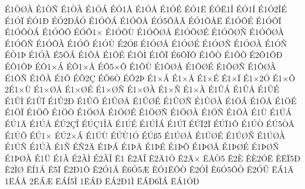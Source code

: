 {^^c91^^d2^^d8^^c0
^^c91^^d2^^d1
^^c91^^d2^^c0
^^c91^^d3^^c1
^^c9^^d31^^c2
^^c91^^d3^^c5
^^c91^^d3^^c9
^^c9^^d31^^cb
^^c9^^d3^^cb1^^ce
^^c9^^d31^^cd
^^c91^^d32^^ce^^c9
^^c91^^d3^^cf
^^c9^^d31^^d0
^^c9^^d32^^d0^^c1^^d3
^^c91^^d3^^d4^^c1
^^c91^^d3^^d4^^c5
^^c9^^d35^^d4^^c5^^c3
^^c9^^d31^^d4^^c5^^cb
^^c91^^d3^^d4^^c9
^^c91^^d3^^d4^^cf
^^c91^^d3^^d4^^d2^^c1
^^c91^^d3^^d4^^d5
^^c9^^d3^^d41^^d7
^^c91^^d3^^d4^^d9
^^c91^^d3^^d4^^d8^^c5
^^c91^^d3^^d4^^d8^^c9
^^c91^^d3^^d4^^d8^^d1
^^c91^^d3^^d4^^d8^^c0
^^c91^^d3^^d4^^d1
^^c91^^d3^^d4^^c0
^^c91^^d3^^d5
^^c91^^d3^^d9
^^c92^^d3^^df
^^c91^^d3^^d8^^c5
^^c91^^d3^^d8^^c9
^^c91^^d3^^d8^^d1
^^c91^^d3^^d8^^c0
^^c91^^d3^^d1
^^c9^^d31^^de
^^c91^^d3^^c0
^^c95^^d4^^c1
^^c91^^d4^^c5
^^c91^^d4^^c9
^^c91^^d4^^cc
^^c91^^d4^^cf
^^c96^^d4^^cf^^d4
^^c91^^d4^^d2
^^c91^^d4^^d5
^^c92^^d41^^d5^^d0
^^c9^^d41^^d5^^de
^^c9^^d41^^d7^^c1
^^c9^^d41^^d7^^c5
^^c9^^d45^^d7^^d5
^^c91^^d4^^d9
^^c91^^d4^^d8^^c5
^^c91^^d4^^d8^^c9
^^c91^^d4^^d8^^d1
^^c91^^d4^^d8^^c0
^^c91^^d4^^d1
^^c91^^d4^^c0
^^c91^^d5
^^c9^^d52^^c7
^^c9^^d56^^d2
^^c9^^d52^^de
^^c91^^d7^^c1
^^c91^^d7^^c5
^^c91^^d7^^c9
^^c91^^d7^^cf
^^c91^^d72^^d3
^^c91^^d7^^d5
2^^c91^^d7^^d9
^^c91^^d7^^d8^^c5
^^c91^^d7^^d8^^c9
^^c91^^d7^^d8^^d1
^^c91^^d7^^d8^^c0
^^c91^^d7^^d1
^^c91^^d7^^c0
^^c91^^db^^c1
^^c91^^db^^c5
^^c91^^db^^c9
^^c91^^db^^cc
^^c91^^db^^cf
^^c91^^db2^^d0
^^c91^^db^^d5
^^c91^^db^^d8^^c5
^^c91^^db^^d8^^c9
^^c91^^db^^d8^^d1
^^c91^^db^^d8^^c0
^^c91^^d6^^c1
^^c91^^d6^^c5
^^c91^^d6^^c9
^^c91^^d6^^cf
^^c91^^d6^^d5
^^c91^^d6^^d6
^^c91^^d6^^d8^^c5
^^c91^^d6^^d8^^c9
^^c91^^d6^^d8^^d1
^^c91^^d6^^d8^^c0
^^c91^^d6^^d1
^^c91^^d6^^c0
^^c91^^d9
^^c91^^da^^c1
^^c9^^da1^^c4
^^c91^^da^^c5
^^c9^^da2^^c7^^ce
^^c9^^da^^c71^^ce^^c5
^^c91^^da^^c9
^^c91^^da^^ce^^c1
^^c91^^da^^cf
^^c9^^da^^cf2^^cf
^^c9^^da^^cf1^^d4
^^c91^^da^^d2
^^c9^^da5^^d2^^c5
^^c91^^da^^d5
^^c9^^da1^^d7
^^c9^^da2^^d7^^c1
^^c91^^da^^d9
^^c9^^da^^d91^^d3
^^c9^^da^^df5
^^c91^^da^^d8^^c5
^^c91^^da^^d8^^c9
^^c91^^da^^d8^^d1
^^c91^^da^^d8^^c0
^^c91^^da^^d1
^^c91^^da^^c0
^^c91^^d1
^^c9^^d12^^c4
^^c91^^de^^c1
^^c91^^de^^c5
^^c91^^de^^c9
^^c91^^de^^d5
^^c91^^de^^d8^^c5
^^c91^^de^^d8^^c9
^^c91^^de^^d8^^d1
^^c91^^de^^d8^^c0
^^c91^^dc
^^c91^^c0
^^c92^^c0^^cc
^^c92^^c0^^ce
^^ca1
^^ca2^^c4^^ce
^^ca2^^c41^^d2
^^ca2^^c4^^d7
^^ca^^c5^^d25
^^ca2^^c8
^^ca^^c82^^d3^^cb
^^ca^^cb^^cf5^^d0
^^ca2^^cc^^d8
^^ca^^cd1^^c1
^^ca5^^cf
^^ca2^^d01^^d4
^^ca2^^d31^^c2
^^ca6^^d35^^c6
^^ca^^d31^^cb^^d5^^d2
^^ca2^^d3^^ce
^^ca6^^d35^^d4^^d2
^^ca2^^d3^^db
^^cb^^c11^^c4
1^^cb^^c1^^c5
2^^cb^^c1^^c6
^^cb^^c1^^cd5^^ce
1^^cb^^c1^^d0
^^cb^^c12^^d01^^cc
^^cb^^c1^^d06^^cc^^c1
^^cb^^c11^^d3^^d0
}
